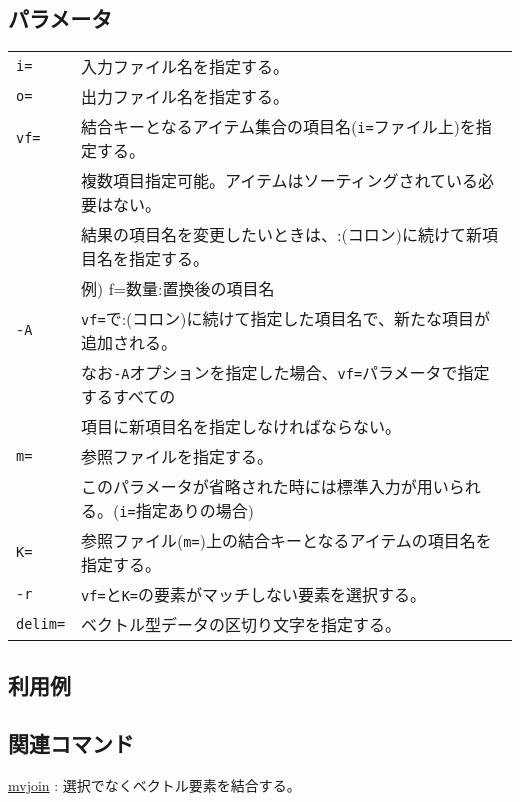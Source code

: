 \subsection*{パラメータ}
\begin{table}[htbp]
{\small
\begin{tabular}{ll}
\verb|i=|  & 入力ファイル名を指定する。\\
\verb|o=|  & 出力ファイル名を指定する。\\
\verb|vf=| & 結合キーとなるアイテム集合の項目名(\verb|i=|ファイル上)を指定する。\\
           & 複数項目指定可能。アイテムはソーティングされている必要はない。 \\
           & 結果の項目名を変更したいときは、:(コロン)に続けて新項目名を指定する。\\
		   & 例) f=数量:置換後の項目名 \\
\verb|-A|  & \verb|vf=|で:(コロン)に続けて指定した項目名で、新たな項目が追加される。\\
           & なお\verb|-A|オプションを指定した場合、\verb|vf=|パラメータで指定するすべての\\
		   & 項目に新項目名を指定しなければならない。\\
\verb|m=|  & 参照ファイルを指定する。\\
           & このパラメータが省略された時には標準入力が用いられる。(\verb|i=|指定ありの場合)\\
\verb|K=|  & 参照ファイル(\verb|m=|)上の結合キーとなるアイテムの項目名を指定する。\\
\verb|-r|  & \verb|vf=|と\verb|K=|の要素がマッチしない要素を選択する。 \\
\verb|delim=| & ベクトル型データの区切り文字を指定する。\\
\end{tabular}
}
\end{table} 

\subsection*{利用例}

\subsection*{関連コマンド}
\hyperref[sect:mvjoin]{mvjoin} : 選択でなくベクトル要素を結合する。

%
